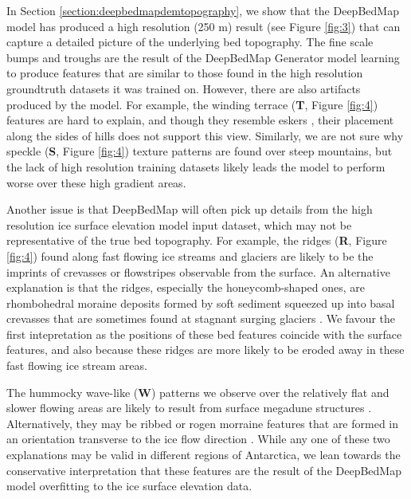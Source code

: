 \documentclass[tc, manuscript]{copernicus}
\begin{document}
In Section \ref{section:deepbedmapdemtopography}, we show that the DeepBedMap model has produced a high resolution (250 m) result (see Figure \ref{fig:3}) that can capture a detailed picture of the underlying bed topography.
The fine scale bumps and troughs are the result of the DeepBedMap Generator model learning to produce features that are similar to those found in the high resolution groundtruth datasets it was trained on.
However, there are also artifacts produced by the model.
For example, the winding terrace (\textbf{T}, Figure \ref{fig:4}) features are hard to explain, and though they resemble eskers \citep{DrewsActivelyevolvingsubglacial2017}, their placement along the sides of hills does not support this view.
Similarly, we are not sure why speckle (\textbf{S}, Figure \ref{fig:4}) texture patterns are found over steep mountains, but the lack of high resolution training datasets likely leads the model to perform worse over these high gradient areas.

Another issue is that DeepBedMap will often pick up details from the high resolution ice surface elevation model \citep{HowatReferenceElevationModel2019} input dataset, which may not be representative of the true bed topography.
For example, the ridges (\textbf{R}, Figure \ref{fig:4}) found along fast flowing ice streams and glaciers are likely to be the imprints of crevasses or flowstripes \citep{GlasserLongitudinalsurfacestructures2012} observable from the surface.
An alternative explanation is that the ridges, especially the honeycomb-shaped ones, are rhombohedral moraine deposits formed by soft sediment squeezed up into basal crevasses that are sometimes found at stagnant surging glaciers \citep{Dowdeswellvarietydistributionsubmarine2016,DowdeswellRhombohedralcrevassefillridges2016,SolheimSeafloormorphologyoutside1985}.
We favour the first intepretation as the positions of these bed features coincide with the surface features, and also because these ridges are more likely to be eroded away in these fast flowing ice stream areas.

The hummocky wave-like (\textbf{W}) patterns we observe over the relatively flat and slower flowing areas are likely to result from surface megadune structures \citep{ScambosSnowMegadune2014}.
Alternatively, they may be ribbed or rogen morraine features that are formed in an orientation transverse to the ice flow direction  \citep{HattestrandRibbedmorainesSweden1997,HattestrandRibbedmoraineformation1999}.
While any one of these two explanations may be valid in different regions of Antarctica, we lean towards the conservative interpretation that these features are the result of the DeepBedMap model overfitting to the ice surface elevation data.
\end{document}
